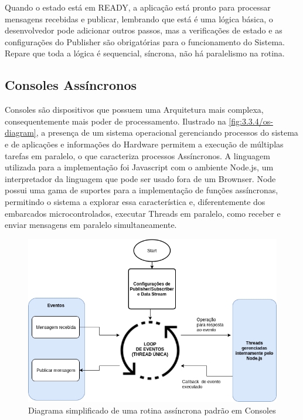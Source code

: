 Quando o estado está em READY, a aplicação está pronto para processar mensagens recebidas e publicar, lembrando que está é uma lógica básica, o desenvolvedor pode adicionar outros passos, mas a verificações de estado e as configurações do Publisher são obrigatórias para o funcionamento do Sistema. Repare que toda a lógica é sequencial, síncrona, não há paralelismo na rotina.

\subsection{Consoles Assíncronos}
\label{subsection:consoles_assinc}

Consoles são dispositivos que possuem uma Arquitetura mais complexa, consequentemente mais poder de processamento. Ilustrado na  \ref{fig:3.3.4/os-diagram}, a presença de um sistema operacional gerenciando processos do sistema e de aplicações e informações do Hardware permitem a execução de múltiplas tarefas em paralelo, o que caracteriza processos Assíncronos. A linguagem utilizada para a implementação foi Javascript com o ambiente Node.js, um interpretador da linguagem que pode ser usado fora de um Brownser. Node possui uma gama de suportes para a implementação de funções assíncronas, permitindo o sistema a explorar essa característica e, diferentemente dos embarcados microcontrolados, executar Threads em paralelo, como receber e enviar mensagens em paralelo simultaneamente.


\begin{figure}[h!]
\centering
\includegraphics[width=13cm]{./02_Capitulos/02_Cap3/figures/async-implementation}
\caption{Diagrama simplificado de uma rotina assíncrona padrão em Consoles}
\label{fig:async-implementation}
\end{figure}

